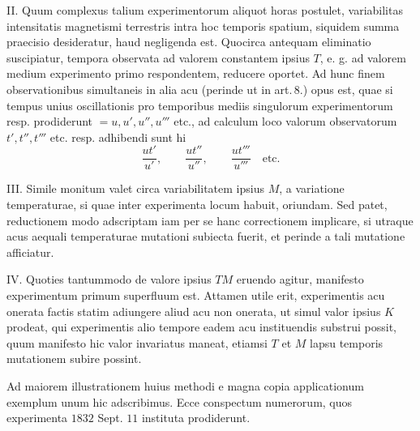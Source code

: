 II. Quum complexus talium experimentorum aliquot horas postulet, variabilitas intensitatis magnetismi terrestris intra hoc temporis spatium, siquidem summa praecisio desideratur, haud negligenda est. Quocirca antequam eliminatio suscipiatur, tempora observata ad valorem constantem ipsius $T$, e. g. ad valorem medium experimento primo respondentem, reducere oportet. Ad hunc finem observationibus simultaneis in alia acu (perinde ut in art.\,8.) opus est, quae si tempus unius oscillationis pro temporibus mediis singulorum experimentorum resp. prodiderunt $=u,u',u'',u'''$ etc., ad calculum loco valorum observatorum $t',t'',t'''$ etc. resp. adhibendi sunt hi
\[
\frac{ut'}{u'},\qquad\frac{ut''}{u''},\qquad\frac{ut'''}{u'''}\quad\text{etc.}
\]

III. Simile monitum valet circa variabilitatem ipsius $M$, a variatione temperaturae, si quae inter experimenta locum habuit, oriundam. Sed patet, reductionem modo adscriptam iam per se hanc correctionem implicare, si utraque acus aequali temperaturae mutationi subiecta fuerit, et perinde a tali mutatione afficiatur.

IV. Quoties tantummodo de valore ipsius $TM$ eruendo agitur, manifesto experimentum primum superfluum est. Attamen utile erit, experimentis acu onerata factis statim adiungere aliud acu non onerata, ut simul valor ipsius $K$ prodeat, qui experimentis alio tempore eadem acu instituendis substrui possit, quum manifesto hic valor invariatus maneat, etiamsi $T$ et $M$ lapsu temporis mutationem subire possint.

Ad maiorem illustrationem huius methodi e magna copia applicationum exemplum unum hic adscribimus. Ecce conspectum numerorum, quos experimenta $1832$ Sept. $11$ instituta prodiderunt.
